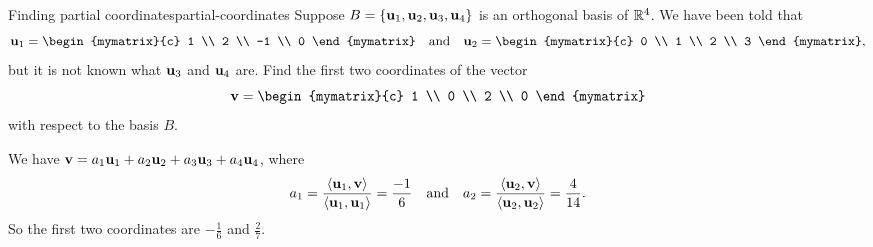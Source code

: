 \begin{example}{Finding partial coordinates}{partial-coordinates}
  Suppose $B=\set{\vect{u}_1,\vect{u}_2,\vect{u}_3,\vect{u}_4}$ is an
  orthogonal basis of $\mathbb{R}^4$. We have been told that
  \begin{equation*}
    \vect{u}_1 = \begin{mymatrix}{c} 1 \\ 2 \\ -1 \\ 0 \end{mymatrix}
    \quad\mbox{and}\quad
    \vect{u}_2 = \begin{mymatrix}{c} 0 \\ 1 \\ 2 \\ 3 \end{mymatrix},
  \end{equation*}
  but it is not known what $\vect{u}_3$ and $\vect{u}_4$ are. Find the
  first two coordinates of the vector
  \begin{equation*}
    \vect{v} = \begin{mymatrix}{c} 1 \\ 0 \\ 2 \\ 0 \end{mymatrix}
  \end{equation*}
  with respect to the basis $B$.
\end{example}

\begin{solution}
  We have $\vect{v} = a_1\vect{u}_1 + a_2\vect{u}_2 + a_3\vect{u}_3 +
  a_4\vect{u}_4$, where
  \begin{equation*}
    a_1
    = \frac{\iprod{\vect{u}_1,\vect{v}}}{\iprod{\vect{u}_1,\vect{u}_1}}
    = \frac{-1}{6}
    \quad\mbox{and}\quad
    a_2
    = \frac{\iprod{\vect{u}_2,\vect{v}}}{\iprod{\vect{u}_2,\vect{u}_2}}
    = \frac{4}{14}.
  \end{equation*}
  So the first two coordinates are $-\frac{1}{6}$ and $\frac{2}{7}$.
\end{solution}

